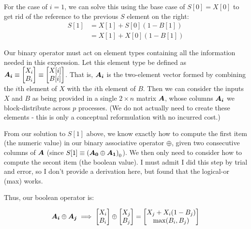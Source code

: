 \documentclass{article}
\newcommand{\aln}[1]{\begin{align*}#1\end{align*}}
\newcommand{\?}{\stackrel{?}{=}}
\begin{document}
For the case of $i = 1$, we can solve this using the base case of $S[0] = X[0]$ to get rid of the reference to the previous $S$ element on the right:
\aln{
  S[1] &= X[1] + S[0](1 - B[1])\\
  &= X[1] + X[0](1 - B[1])
}

Our binary operator must act on element types containing all the information needed in this expression.
Let this element type be defined as $\vct{A_i} \equiv \begin{bmatrix*}X_i\\B_i\end{bmatrix*} \equiv \begin{bmatrix*}X[i]\\B[i]\end{bmatrix*}$.
That is, $\bm{A_i}$ is the two-element vector formed by combining the $i$th element of $X$ with the $i$th element of $B$.
Then we can consider the inputs $X$ and $B$ as being provided in a single $2\times n$ matrix $\bm{A}$, whose columns $\bm{A_i}$ we block-distribute across $p$ processes.
(We do not actually need to create these elements - this is only a conceptual reformulation with no incurred cost.)

From our solution to $S[1]$ above, we know exactly how to compute the first item (the numeric value) in our binary associative operator $\oplus$, given two consecutive columns of $\bm{A}$ (since $S[1] \equiv \left(\vct{A_0} \oplus \vct{A_1}\right)_0$).
We then only need to consider how to compute the secont item (the boolean value).
I must admit I did this step by trial and error, so I don't provide a derivation here, but found that the logical-or (max) works.

Thus, our boolean operator is:

$$\mtx{A_{i}} \oplus \mtx{A_j} \implies \begin{bmatrix*}X_i\\B_i\end{bmatrix*} \oplus\begin{bmatrix*}X_j\\B_j\end{bmatrix*} = \begin{bmatrix*}X_j + X_i(1-B_j)\\\max(B_i, B_j)\end{bmatrix*}$$
\end{document}
